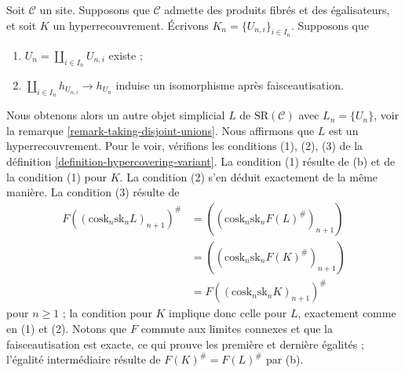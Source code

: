 \begin{remark}
\label{remark-take-unions-hypercovering}
Soit $\mathcal{C}$ un site. Supposons que $\mathcal{C}$ admette
des produits fibrés et des égalisateurs, et soit $K$ un hyperrecouvrement.
Écrivons $K_n = \{U_{n, i}\}_{i \in I_n}$. Supposons que
\begin{enumerate}
\item[(a)] $U_n = \coprod_{i \in I_n} U_{n, i}$ existe ;
\item[(b)] $\coprod_{i \in I_n} h_{U_{n, i}} \to h_{U_n}$ induise
un isomorphisme après faisceautisation.
\end{enumerate}
Nous obtenons alors un autre objet simplicial $L$ de $\text{SR}(\mathcal{C})$
avec $L_n = \{U_n\}$, voir la
remarque \ref{remark-taking-disjoint-unions}.
Nous affirmons que $L$ est un hyperrecouvrement.
Pour le voir, vérifions les conditions (1), (2), (3) de la
définition \ref{definition-hypercovering-variant}.
La condition (1) résulte de (b) et de la condition (1) pour $K$.
La condition (2) s'en déduit exactement de la même manière.
La condition (3) résulte de
\begin{align*}
F((\text{cosk}_n \text{sk}_n L)_{n + 1})^\#
& =
((\text{cosk}_n \text{sk}_n F(L)^\#)_{n + 1}) \\
& =
((\text{cosk}_n \text{sk}_n F(K)^\#)_{n + 1}) \\
& =
F((\text{cosk}_n \text{sk}_n K)_{n + 1})^\#
\end{align*}
pour $n \geq 1$ ; la condition pour $K$ implique donc celle pour
$L$, exactement comme en (1) et (2).
Notons que $F$ commute aux limites connexes et que la faisceautisation est exacte,
ce qui prouve les première et dernière égalités ; l'égalité intermédiaire résulte de
$F(K)^\# = F(L)^\#$ par (b).
\end{remark}

